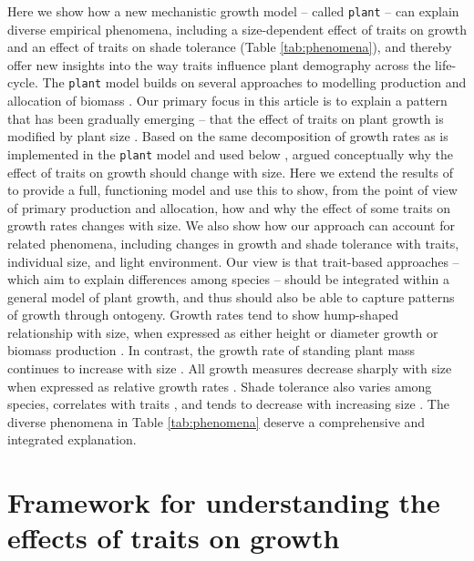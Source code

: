 \documentclass[9pt,twocolumn,twoside,lineno]{pnas-new}
\newcommand{\plant}{\texttt{plant}}
\begin{document}
Here we show how a new mechanistic growth model -- called {\plant} \citep{Falster-2016} -- can explain diverse empirical phenomena, including a size-dependent effect of traits on growth and an effect of traits on shade tolerance (Table \ref{tab:phenomena}), and thereby offer new insights into the way traits influence plant demography across the life-cycle. The {\plant} model builds on several approaches to modelling production and allocation of biomass \citep[e.g.][]{Givnish-1988, Yokozawa-1995,Makela-1997, Moorcroft-2001, Sitch-2008, Falster-2011, King-2011, Gibert-2016}. Our primary focus in this article is to explain a pattern that has been gradually emerging -- that the effect of traits on plant growth is modified by plant size \citep{Ruger-2012, Iida-2014, Gibert-2016}. Based on the same decomposition of growth rates as is implemented in the {\plant} model and used below \citep[from][]{Falster-2011}, \citep{Gibert-2016} argued conceptually why the effect of traits on growth should change with size. Here we extend the results of \citep{Gibert-2016} to provide a full, functioning model and use this to show, from the point of view of primary production and allocation, how and why the effect of some traits on growth rates changes with size. We also show how our approach can account for related phenomena, including changes in growth and shade tolerance with traits, individual size, and light environment. Our view is that trait-based approaches -- which aim to explain differences among species -- should be integrated within a general model of plant growth, and thus should also be able to capture patterns of growth through ontogeny. Growth rates tend to show hump-shaped relationship with size, when expressed as either height \citep{Sillett-2010, King-2011} or diameter growth \citep{Canham-2004, Canham-2006, Herault-2011} or biomass production \citep{Givnish-1988, Koch-2004}. In contrast, the growth rate of standing plant mass continues to increase with size \citep{Sillett-2010, Stephenson-2014}. All growth measures decrease sharply with size when expressed as relative growth rates \citep{Rees-2010, Iida-2014}. Shade tolerance also varies among species, correlates with traits \citep{Messier-1999, Lusk-2008, Poorter-2006}, and tends to decrease with increasing size \citep{Givnish-1988, Kneeshaw-2006, Lusk-2008}. The diverse phenomena in Table \ref{tab:phenomena} deserve a comprehensive and integrated explanation.

\section*{Framework for understanding the effects of traits on growth}
\end{document}
